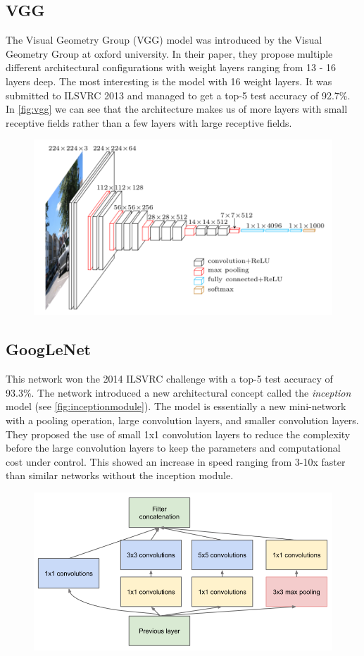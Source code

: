 \subsection{VGG}
The Visual Geometry Group (VGG) model was introduced by the Visual Geometry Group at oxford university. In their paper, they propose multiple different architectural configurations with weight layers ranging from 13 - 16 layers deep. The most interesting is the model with 16 weight layers. It was submitted to ILSVRC 2013 and managed to get a top-5 test accuracy of 92.7\%. In \autoref{fig:vgg} we can see that the architecture makes us of more layers with small receptive fields rather than a few layers with large receptive fields.

\begin{figure}[H]
	\centering
	\includegraphics[width=0.7\linewidth]{fig/vgg16.png}
	\label{fig:vgg}
\end{figure}


\subsection{GoogLeNet}
This network won the 2014 ILSVRC challenge with a top-5 test accuracy of 93.3\%. The network introduced a new architectural concept called the \emph{inception} model (see \autoref{fig:inceptionmodule}). The model is essentially a new mini-network with a pooling operation, large convolution layers, and smaller convolution layers. They proposed the use of small 1x1 convolution layers to reduce the complexity before the large convolution layers to keep the parameters and computational cost under control. This showed an increase in speed ranging from 3-10x faster than similar networks without the inception module.

\begin{figure}[H]
	\centering
	\includegraphics[width=0.7\linewidth]{fig/googlenet.png}
	\label{fig:inceptionmodule}
\end{figure}


